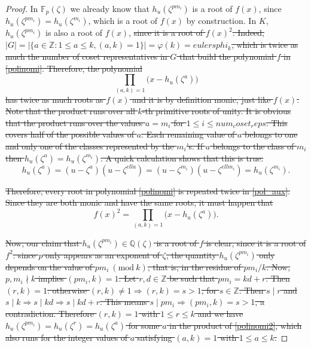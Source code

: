 \documentclass[a4paper, 12pt]{article}
\theoremstyle{definition}
\theoremstyle{remark}
\newcommand{\Z}{\ensuremath{\mathbb{Z}}}
\newcommand{\Q}{\ensuremath{\mathbb{Q}}}
\newcommand{\F}{\ensuremath{\mathbb{F}}}
\newcommand{\Mod}[1]{\ (\mathrm{mod}\ #1)} %
\begin{document}
\begin{proof}
In $\F_p(\zeta)$ we already know that $h_{{u}}(\zeta^{pm_i})$ is a root of $f(x)$, since $h_{{u}}(\zeta^{pm_i})=h_{{u}}(\zeta^{m_i})$, which is a root of $f(x)$ by construction. In $K$, $h_{{u}}(\zeta^{pm_i})$ is also a root of $f(x)$, \sout{since it is a root of $f(x)^2$. Indeed, $|G|=|\{a\in\Z: 1\leqslant a \leqslant {k}, (a,{k})=1\}|=\varphi({k})={eulersphi_k}$, which is twice as much the number of coset representatives in $G$ that build the polynomial $f$ in \eqref{polinomi}. Therefore, the polynomial}
\begin{equation}\label{pol_aux}
\prod_{(a,{k})=1}\big(x-h_{{u}}(\zeta^a)\big)
\end{equation}
\sout{has twice as much roots as $f(x)$ and it is by definition monic, just like $f(x)$. Note that the product runs over all ${k}$-th primitive roots of unity. It is obvious that the product runs over the values $a=m_i$ for $1\leqslant i \leqslant {num_coset_reps}$. This covers half of the possible values of $a$. Each remaining value of $a$ belongs to one and only one of the classes represented by the $m_i$'s. If $a$ belongs to the class of $m_i$ then $h_{{u}}(\zeta^a)=h_{{u}}(\zeta^{m_i})$. A quick calculation shows that this is true:}
\begin{equation*}
h_{{u}}(\zeta^a)=({u}-\zeta^a)({u}-\zeta^{{ell}a})=({u}-\zeta^{m_i})({u}-\zeta^{{ell}m_i})=h_{{u}}(\zeta^{m_i}).
\end{equation*} 

\sout{Therefore, every root in polynomial \eqref{polinomi} is repeated twice in \eqref{pol_aux}. Since they are both monic and have the same roots, it must happen that}
\begin{equation}\label{polinomi2}
f(x)^2=\prod_{(a,{k})=1}\big(x-h_{{u}}(\zeta^a)\big).
\end{equation}

\sout{Now, our claim that $h_{{u}}(\zeta^{pm_i})\in\Q(\zeta)$ is a root of $f$ is clear, since it is a root of $f^2$: since $p$ only appears as an exponent of $\zeta$, the quantity $h_{{u}}(\zeta^{pm_i})$ only depends on the value of $pm_i \Mod{{k}}$, that is, in the residue of $pm_i/{k}$. Now, $p,m_i\nmid {k}$ implies $(pm_i,{k})=1$. Let $r,d\in\Z$ be such that $pm_i={k}d+r$. Then $(r,{k})=1$: otherwise $(r,{k})\neq 1\Rightarrow (r,{k})=s>1$, for $s\in\Z$. Then $s\mid r$ and $s\mid {k}\Rightarrow s\mid {k}d \Rightarrow s\mid {k}d+r$. This means $s\mid pm_i\Rightarrow (pm_i,{k})=s>1$, a contradiction. Therefore $(r,{k})=1$ with $1\leqslant r \leqslant{k}$ and we have $h_{{u}}(\zeta^{pm_i})=h_{{u}}(\zeta^{r})=h_{{u}}(\zeta^{a})$ for some $a$ in the product of \eqref{polinomi2}, which also runs for the integer values of $a$ satisfying $(a,{k})=1$ with $1\leqslant a \leqslant{k}$.}


\end{proof}
\end{document}
